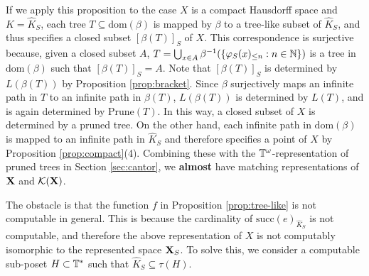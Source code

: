 \documentclass{eptcs-modified}
\begin{document}
If we apply this proposition to the case $X$ is a compact Hausdorff space and
$K = \widehat{K}_{S}$,  each tree $T \subseteq \mathrm{dom}(\beta)$
is mapped by $\beta$ to a tree-like subset of $\widehat{K}_{S}$, and thus
\textsf{}specifies a closed subset $[\beta(T)]_S$ of $X$. This correspondence is surjective
because, given a closed subset $A$,  $T = \bigcup_{x \in A}
\beta^{-1}(\{{\varphi_S(x)_{\leq n}}: n \in \mathbb{N}\})$ is a tree in $\mathrm{dom}(\beta)$
such that
$[\beta(T)]_S = A$.
Note that $[\beta(T)]_S$ is determined by $L(\beta(T))$ by Proposition \ref{prop:bracket}.
Since $\beta$ surjectively maps an infinite path in $T$ to an infinite path in $\beta(T)$,
$L(\beta(T))$ is determined by $L(T)$, and is again determined by $\textrm{Prune}(T)$.
In this way, a closed subset of $X$ is determined by a pruned tree.
On the other hand, each infinite path in $\mathrm{dom}(\beta)$ is mapped to an infinite path in
$\widehat{K}_{S}$ and therefore  specifies
 a point of $X$ by Proposition  \ref{prop:compact}(4).
Combining these with the $\mathbb{T}^\omega$-representation of pruned trees in Section \ref{sec:cantor},
we {\bf almost} have matching representations of $\mathbf{X}$ and ${\cal K}(\mathbf{X})$.

The obstacle is that the function $f$ in Proposition \ref{prop:tree-like} is not computable in general. This is because the cardinality of
$\mathrm{succ}(e)_{\widehat{K}_{S}}$ is not computable, and therefore
the above representation of $X$ is not computably isomorphic to the represented space  $\mathbf{X}_S$.
To solve this, we consider a computable sub-poset $H \subset \mathbb{T}^*$
such that $\widehat{K}_{S} \subseteq \tau(H)$.
\end{document}
